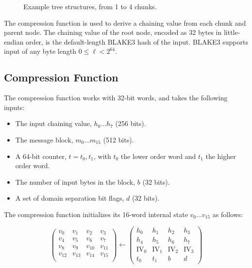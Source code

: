 \documentclass[11pt,notitlepage,a4paper]{article}
\newcommand{\IV}{\text{IV}}
\begin{document}
\begin{figure}[h]
\centering
 
\caption{Example tree structures, from 1 to 4 chunks.}
\label{fig:fourchunks}
\end{figure}

The compression function is used to derive a chaining value from each chunk and
parent node. The chaining value of the root node, encoded as 32 bytes in
little-endian order, is the default-length BLAKE3 hash of the input. BLAKE3
supports input of any byte length $0 \leq \ell < 2^{64}$.

\subsection{Compression Function}\label{sec:compression}

The compression function works with 32-bit words, and takes the
following inputs:

\begin{itemize}
    \item The input chaining value, $h_{0} \ldots h_{7}$ (256 bits).
    \item The message block, $m_{0} \ldots m_{15}$  (512 bits).
    \item A 64-bit counter, $t=t_{0},t_{1}$, with $t_{0}$ the lower order word
        and $t_{1}$ the higher order word.
    \item The number of input bytes in the block, $b$ (32 bits).
    \item A set of domain separation bit flags, $d$ (32 bits).
\end{itemize}

The compression function initializes its 16-word internal state $v_{0} \ldots
v_{15}$ as follows: 

\begin{equation*}
\begin{pmatrix}
v_{0} & v_{1} & v_{2} & v_{3} \\
v_{4} & v_{5} & v_{6} & v_{7} \\
v_{8} & v_{9} & v_{10} & v_{11} \\
v_{12} & v_{13} & v_{14} & v_{15} \\
\end{pmatrix}
\leftarrow
\begin{pmatrix}
h_{0} & h_{1} & h_{2} & h_{3} \\
h_{4} & h_{5} & h_{6} & h_{7} \\
\IV_{0} & \IV_{1} & \IV_{2} & \IV_{3} \\
t_{0} & t_{1} & b & d 
\end{pmatrix}
\end{equation*}
\end{document}
